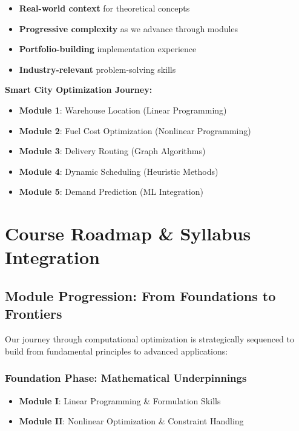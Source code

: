 \documentclass[
  letterpaper,
  DIV=11,
  numbers=noendperiod]{scrreprt}
\providecommand{\tightlist}{%
  \setlength{\itemsep}{0pt}\setlength{\parskip}{0pt}}
\begin{document}
\begin{itemize}
\tightlist
\item
  \textbf{Real-world context} for theoretical concepts
\item
  \textbf{Progressive complexity} as we advance through modules
\item
  \textbf{Portfolio-building} implementation experience
\item
  \textbf{Industry-relevant} problem-solving skills
\end{itemize}

\textbf{Smart City Optimization Journey:}

\begin{itemize}
\tightlist
\item
  \textbf{Module 1}: Warehouse Location (Linear Programming)
\item
  \textbf{Module 2}: Fuel Cost Optimization (Nonlinear Programming)
\item
  \textbf{Module 3}: Delivery Routing (Graph Algorithms)
\item
  \textbf{Module 4}: Dynamic Scheduling (Heuristic Methods)
\item
  \textbf{Module 5}: Demand Prediction (ML Integration)
\end{itemize}

\section{Course Roadmap \& Syllabus
Integration}\label{course-roadmap-syllabus-integration}

\subsection{Module Progression: From Foundations to
Frontiers}\label{module-progression-from-foundations-to-frontiers}

Our journey through computational optimization is strategically
sequenced to build from fundamental principles to advanced applications:

\subsubsection{Foundation Phase: Mathematical
Underpinnings}\label{foundation-phase-mathematical-underpinnings}

\begin{itemize}
\tightlist
\item
  \textbf{Module I}: Linear Programming \& Formulation Skills
\item
  \textbf{Module II}: Nonlinear Optimization \& Constraint Handling
\end{itemize}
\end{document}
